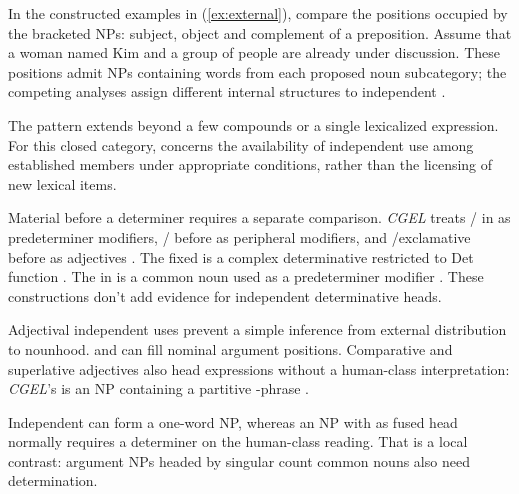 \documentclass[12pt]{article}
\begin{document}
In the constructed examples in (\ref{ex:external}), compare the positions occupied by the bracketed NPs: subject, object and complement of a preposition. Assume that a woman named Kim and a group of people are already under discussion. These positions admit NPs containing words from each proposed noun subcategory; the competing analyses assign different internal structures to independent .

\begin{samepage}
\ea\label{ex:external}
\ea {}\qquad {}\qquad {}
\ex {}\qquad {}\qquad {}
\ex {}\qquad {}\qquad {}
\ex {}\qquad {}\qquad {}
\z\z
\end{samepage}

The pattern extends beyond a few compounds or a single lexicalized expression. For this closed category,  concerns the availability of independent use among established members under appropriate conditions, rather than the licensing of new lexical items.

Material before a determiner requires a separate comparison. \textit{CGEL} treats / in  as predeterminer modifiers, / before  as peripheral modifiers, and /exclamative  before  as adjectives \citep[433--437]{huddleston2002}. The fixed  is a complex determinative restricted to Det function \citep[394]{huddleston2002}. The  in  is a common noun used as a predeterminer modifier \citep[434]{huddleston2002}. These constructions don't add evidence for independent determinative heads.

Adjectival independent uses prevent a simple inference from external distribution to nounhood.  and  can fill nominal argument positions. Comparative and superlative adjectives also head expressions without a human-class interpretation: \textit{CGEL}'s  is an NP containing a partitive -phrase \citep[332--333, 416--423]{huddleston2002}.

Independent  can form a one-word NP, whereas an NP with  as fused head normally requires a determiner on the human-class reading. That is a local contrast: argument NPs headed by singular count common nouns also need determination.
\end{document}
